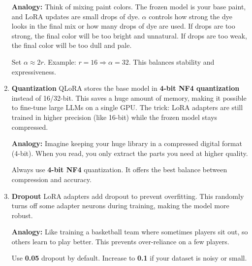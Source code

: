 \begin{enumerate}
    \textbf{Analogy:} Think of mixing paint colors. The frozen model is your base paint, and LoRA updates are small drops of dye. $\alpha$ controls how strong the dye looks in the final mix or how many drops of dye are used. If drops are too strong, the final color will be too bright and unnatural. If drops are too weak, the final color will be too dull and pale.

    \begin{tcolorbox}[colback=orange!5,colframe=orange!85!black,title=Rule of Thumb]
        Set $\alpha \approx 2r$.  
        Example: $r=16 \Rightarrow \alpha=32$.  
        This balances stability and expressiveness.
    \end{tcolorbox}

    \item \textbf{Quantization}  
    QLoRA stores the base model in \textbf{4-bit NF4 quantization} instead of 16/32-bit.  
    This saves a huge amount of memory, making it possible to fine-tune large LLMs on a single GPU.  
    The trick: LoRA adapters are still trained in higher precision (like 16-bit) while the frozen model stays compressed.  

    \textbf{Analogy:} Imagine keeping your huge library in a compressed digital format (4-bit). When you read, you only extract the parts you need at higher quality.  

    \begin{tcolorbox}[colback=purple!5,colframe=purple!70!black,title=Rule of Thumb]
        Always use \textbf{4-bit NF4} quantization.  
        It offers the best balance between compression and accuracy.
    \end{tcolorbox}

    \item \textbf{Dropout}  
    LoRA adapters add dropout to prevent overfitting. This randomly turns off some adapter neurons during training, making the model more robust.  

    \textbf{Analogy:} Like training a basketball team where sometimes players sit out, so others learn to play better. This prevents over-reliance on a few players.  

    \begin{tcolorbox}[colback=red!5,colframe=red!75!black,title=Rule of Thumb]
        Use \textbf{0.05} dropout by default.  
        Increase to \textbf{0.1} if your dataset is noisy or small.
    \end{tcolorbox}
\end{enumerate}

